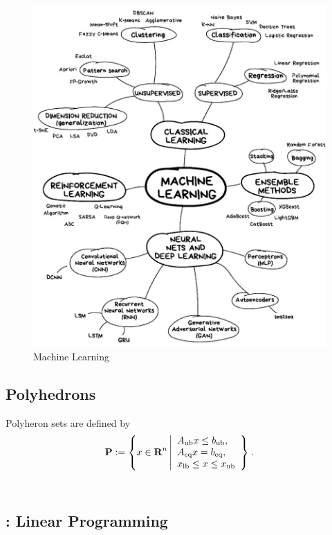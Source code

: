 \documentclass{article}
\begin{document}
\begin{figure}[h!]
\centering
\includegraphics[width=1\textwidth]{./figs/np/ml.jpg}
\caption{Machine Learning}
\label{fig:ml}
\end{figure}
\clearpage

\subsection{Polyhedrons}
Polyheron sets are defined by
\begin{align}
    \textbf{P} := \left\{x\in\textbf{R}^n \left|
            \begin{array}{lllllllllllllllllll}
            A_{\text{ub}} x\leq b_{\text{ub}},\\
            A_{\text{eq}} x = b_{\text{eq}},\\
            x_{\text{lb}} \leq x \leq x_{\text{ub}}
            \end{array}
    \right\}\right.. 
\end{align}
\\
\subsection{\LP: Linear Programming}
\end{document}
